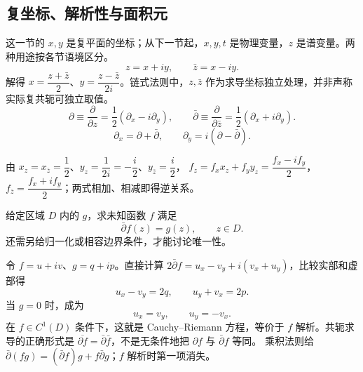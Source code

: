 \documentclass[lang=cn,scheme=chinese,mode=simple,device=normal,color=blue,math=cm,thmcnt=section,12pt]{elegantbook}
\newcommand{\eqq}[2]{\tag{#1}\label{eq:#1}#2}
\begin{document}
\subsection{复坐标、解析性与面积元}
这一节的 $x,y$ 是复平面的坐标；从下一节起，$x,y,t$ 是物理变量，$z$ 是谱变量。两种用途按各节语境区分。
\begin{equation}
\eqq{7.1.1}{z=x+iy,\qquad \bar z=x-iy.}
\end{equation}
解得 $x=\dfrac{z+\bar z}{2}$、$y=\dfrac{z-\bar z}{2i}$。链式法则中，$z,\bar z$ 作为求导坐标独立处理，并非声称实际复共轭可独立取值。
\begin{equation}
\eqq{7.1.2}{\partial\equiv\dfrac{\partial}{\partial z}=\dfrac{1}{2}(\partial_x-i\partial_y),\qquad
\bar\partial\equiv\dfrac{\partial}{\partial\bar z}=\dfrac{1}{2}(\partial_x+i\partial_y).}
\end{equation}
\begin{equation}
\eqq{7.1.3}{\partial_x=\partial+\bar\partial,\qquad \partial_y=i(\partial-\bar\partial).}
\end{equation}
\begin{callout}
由 $x_z=x_{\bar z}=\dfrac{1}{2}$、$y_z=\dfrac{1}{2i}=-\dfrac{i}{2}$、$y_{\bar z}=\dfrac{i}{2}$，
$f_z=f_xx_z+f_yy_z=\dfrac{f_x-if_y}{2}$，$f_{\bar z}=\dfrac{f_x+if_y}{2}$；两式相加、相减即得逆关系。
\end{callout}
\begin{definition}
给定区域 $D$ 内的 $g$，求未知函数 $f$ 满足
\begin{equation}
\eqq{7.1.4}{\bar\partial f(z)=g(z),\qquad z\in D.}
\end{equation}
还需另给归一化或相容边界条件，才能讨论唯一性。
\end{definition}
令 $f=u+iv$、$g=q+ip$。直接计算 $2\bar\partial f=u_x-v_y+i(v_x+u_y)$，比较实部和虚部得
\begin{equation}
\eqq{7.1.5}{u_x-v_y=2q,\qquad u_y+v_x=2p.}
\end{equation}
当 $g=0$ 时，成为
\begin{equation}
\eqq{7.1.6}{u_x=v_y,\qquad u_y=-v_x.}
\end{equation}
在 $f\in C^1(D)$ 条件下，这就是 Cauchy--Riemann 方程，等价于 $f$ 解析。共轭求导的正确形式是
$\overline{\partial f}=\bar\partial\bar f$，不是无条件地把 $\partial f$ 与 $\bar\partial f$ 等同。
乘积法则给 $\bar\partial(fg)=(\bar\partial f)g+f\bar\partial g$；$f$ 解析时第一项消失。
\end{document}
